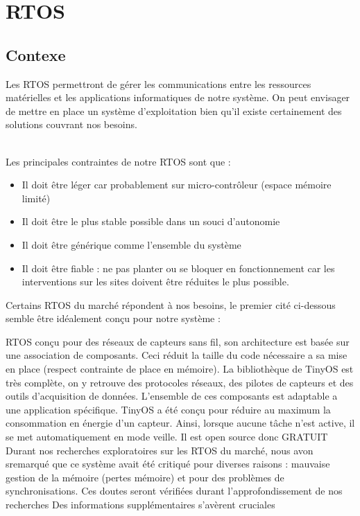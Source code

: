 \section{RTOS}
	\subsection {Contexe}
		Les RTOS permettront de gérer les communications entre les ressources matérielles et les applications informatiques de notre système. On peut envisager de mettre en place un système d'exploitation bien qu'il existe certainement des solutions couvrant nos besoins. \\~
		
		Les principales contraintes de notre RTOS sont que :
		\begin{itemize}
				\item Il doit être léger car probablement sur micro-contrôleur (espace mémoire limité)
				\item Il doit être le plus stable possible dans un souci d'autonomie
				\item Il doit être générique comme l'ensemble du système
				\item Il doit être fiable : ne pas planter ou se bloquer en fonctionnement car les interventions sur les sites doivent être réduites le plus possible.
		\end{itemize}

		Certains RTOS du marché répondent à nos besoins, le premier cité ci-dessous semble être idéalement conçu pour notre système :
		
		  
{RTOS conçu pour des réseaux de capteurs sans fil, son architecture est basée sur une association de composants.}
{Ceci réduit la taille du code nécessaire a sa mise en place (respect contrainte de place en mémoire). La bibliothèque de TinyOS est très complète, on y retrouve des protocoles réseaux, des pilotes de capteurs et des outils d'acquisition de données. L'ensemble de ces composants est adaptable a une application spécifique.}
{TinyOS a été conçu pour réduire au maximum la consommation en énergie d’un capteur. Ainsi, lorsque aucune tâche n’est active, il se met automatiquement en mode veille.}
{Il est open source donc GRATUIT}
{Durant nos recherches exploratoires sur les RTOS du marché, nous avon sremarqué que ce système avait été critiqué pour diverses raisons : mauvaise
gestion de la mémoire (pertes mémoire) et pour des problèmes de synchronisations. Ces doutes seront vérifiées durant l'approfondissement de nos recherches}
{Des informations supplémentaires s'avèrent cruciales}

